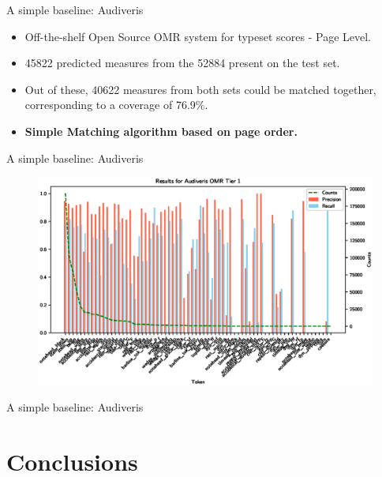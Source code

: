 \documentclass[UKenglish, aspectratio = 169]{beamer}
\begin{document}

\begin{frame}[c]{A simple baseline: Audiveris}
	\begin{itemize}
		\item Off-the-shelf Open Source OMR system for typeset scores - Page Level.
		\item 45822 predicted measures from the 52884 present on the test set.
		\item Out of these, 40622 measures from both sets could be matched together, corresponding to a coverage of 76.9\%.
		\item \textbf{Simple Matching algorithm based on page order.}
	\end{itemize}
\end{frame}


\hidelogo
\begin{frame}[c]{A simple baseline: Audiveris}
	\begin{figure}
		\includegraphics[width=.88\textwidth]{images/tier1.eps}
	\end{figure}
\end{frame}
\showlogo


\begin{frame}[c]{A simple baseline: Audiveris}
	
\end{frame}



\section{Conclusions}
\SectionPage
\end{document}
